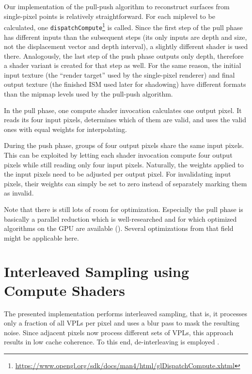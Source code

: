 Our implementation of the pull-push algorithm to reconstruct surfaces from single-pixel points is relatively straightforward. For each miplevel to be calculated, one \texttt{dispatchCompute}\footnote{\url{https://www.opengl.org/sdk/docs/man4/html/glDispatchCompute.xhtml}} is called. Since the first step of the pull phase has different inputs than the subsequent steps (its only inputs are depth and size, not the displacement vector and depth interval), a slightly different shader is used there. Analogously, the last step of the push phase outputs only depth, therefore a shader variant is created for that step as well. For the same reason, the initial input texture (the ``render target'' used by the single-pixel renderer) and final output texture (the finished ISM used later for shadowing) have different formats than the mipmap levels used by the pull-push algorithm.


In the pull phase, one compute shader invocation calculates one output pixel. It reads its four input pixels, determines which of them are valid, and uses the valid ones with equal weights for interpolating.


During the push phase, groups of four output pixels share the same input pixels. This can be exploited by letting each shader invocation compute four output pixels while still reading only four input pixels. Naturally, the weights applied to the input pixels need to be adjusted per output pixel. For invalidating input pixels, their weights can simply be set to zero instead of separately marking them as invalid.

Note that there is still lots of room for optimization. Especially the pull phase is basically a parallel reduction which is well-researched and for which optimized algorithms on the GPU are available (\cite{Harris:2007:ParallelReduction}). Several optimizations from that field might be applicable here.



\section{Interleaved Sampling using Compute Shaders}
\label{sec:impl:interleavedShading}

The presented implementation performs interleaved sampling, that is, it processes only a fraction of all VPLs per pixel and uses a blur pass to mask the resulting noise. Since adjacent pixels now process different sets of VPLs, this approach results in low cache coherence. To this end, de-interleaving is employed \citep{segovia2006non}.

